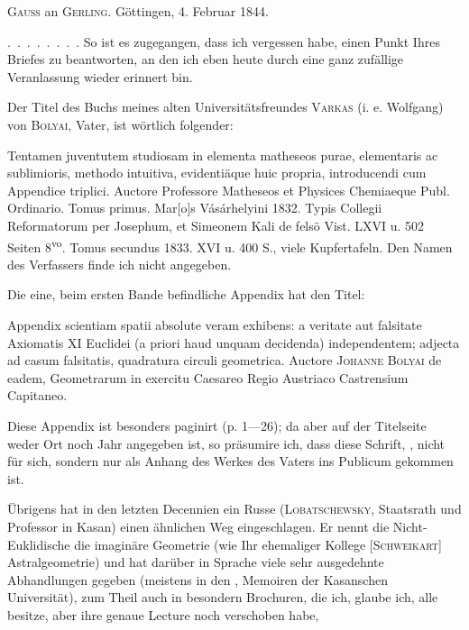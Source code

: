 %
\begin{center}\textsc{Gauss} an \textsc{Gerling}. Göttingen, 4. Februar 1844.\end{center}

\mbox{.\ .\ .\ .\ .\ .\ .\ .} So ist es zugegangen, dass ich vergessen habe, einen  Punkt Ihres Briefes zu beantworten, an den ich eben heute durch eine ganz zufällige Veranlassung wieder erinnert bin.

Der Titel des Buchs meines alten Universitätsfreundes \textsc{Varkas} (i. e. Wolfgang) von \textsc{Bolyai}, Vater, ist wörtlich folgender:

Tentamen juventutem studiosam in elementa matheseos purae, elementaris ac sublimioris, methodo intuitiva, evidenti\"aque huic propria, introducendi cum Appendice triplici. Auctore Professore Matheseos et Physices Chemiaeque Publ. Ordinario. Tomus primus. Mar[o]s Vásárhelyini 1832. Typis Collegii Reformatorum per Josephum, et Simeonem Kali de felsö Vist. LXVI u. 502 Seiten 8\textsuperscript{vo}. Tomus secundus 1833. XVI u. 400 S., viele Kupfertafeln. Den Namen des Verfassers finde ich nicht angegeben.

Die eine, beim ersten Bande befindliche Appendix hat den Titel:

Appendix scientiam spatii absolute veram exhibens: a veritate aut falsitate Axiomatis XI Euclidei (a priori haud unquam decidenda) independentem; adjecta ad casum falsitatis, quadratura circuli geometrica. Auctore \textsc{Johanne} \textsc{Bolyai} de eadem, Geometrarum in exercitu Caesareo Regio Austriaco Castrensium Capitaneo.

Diese Appendix ist besonders paginirt (p. 1---26); da aber auf der Titelseite weder Ort noch Jahr angegeben ist, so präsumire ich, dass diese Schrift, , nicht für sich, sondern nur als Anhang des Werkes des Vaters ins Publicum gekommen ist.

Übrigens hat in den letzten Decennien ein Russe (\textsc{Lobatschewsky}, Staatsrath und Professor in Kasan) einen ähnlichen Weg eingeschlagen. Er nennt die Nicht-Euklidische die imaginäre Geometrie (wie Ihr ehemaliger Kollege [\textsc{Schweikart}] Astralgeometrie) und hat darüber in  Sprache viele sehr ausgedehnte Abhandlungen gegeben (meistens in den , Memoiren der Kasanschen Universität), zum Theil auch in besondern Brochuren, die ich, glaube ich, alle besitze, aber ihre genaue Lecture noch verschoben habe,
